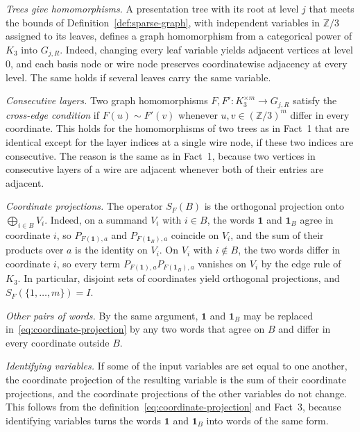 \begin{list}{}{\setlength{\labelwidth}{3.6em}\setlength{\labelsep}{0.6em}\setlength{\leftmargin}{4.2em}\setlength{\itemsep}{3pt}\setlength{\parsep}{0pt}\setlength{\topsep}{4pt}}
\item[\textup{Fact 1.}] \emph{Trees give homomorphisms.} A presentation tree with its root at level $j$ that meets the bounds of Definition~\ref{def:sparse-graph}, with independent variables in $\mathbb Z/3$ assigned to its leaves, defines a graph homomorphism from a categorical power of $K_3$ into $G_{j,R}$. Indeed, changing every leaf variable yields adjacent vertices at level $0$, and each basis node or wire node preserves coordinatewise adjacency at every level. The same holds if several leaves carry the same variable.
\item[\textup{Fact 2.}] \emph{Consecutive layers.} Two graph homomorphisms $F,F':K_3^{\times m}\to G_{j,R}$ satisfy the \emph{cross-edge condition} if $F(u)\sim F'(v)$ whenever $u,v\in(\mathbb Z/3)^m$ differ in every coordinate. This holds for the homomorphisms of two trees as in Fact~1 that are identical except for the layer indices at a single wire node, if these two indices are consecutive. The reason is the same as in Fact~1, because two vertices in consecutive layers of a wire are adjacent whenever both of their entries are adjacent.
\item[\textup{Fact 3.}] \emph{Coordinate projections.} The operator $S_F(B)$ is the orthogonal projection onto $\bigoplus_{i\in B}V_i$. Indeed, on a summand $V_i$ with $i\in B$, the words $\mathbf 1$ and $\mathbf 1_B$ agree in coordinate $i$, so $P_{F(\mathbf 1),a}$ and $P_{F(\mathbf 1_B),a}$ coincide on $V_i$, and the sum of their products over $a$ is the identity on $V_i$. On $V_i$ with $i\notin B$, the two words differ in coordinate $i$, so every term $P_{F(\mathbf 1),a}P_{F(\mathbf 1_B),a}$ vanishes on $V_i$ by the edge rule of $K_3$. In particular, disjoint sets of coordinates yield orthogonal projections, and $S_F(\{1,\ldots,m\})=I$.
\item[\textup{Fact 4.}] \emph{Other pairs of words.} By the same argument, $\mathbf 1$ and $\mathbf 1_B$ may be replaced in~\eqref{eq:coordinate-projection} by any two words that agree on $B$ and differ in every coordinate outside $B$.
\item[\textup{Fact 5.}] \emph{Identifying variables.} If some of the input variables are set equal to one another, the coordinate projection of the resulting variable is the sum of their coordinate projections, and the coordinate projections of the other variables do not change. This follows from the definition~\eqref{eq:coordinate-projection} and Fact~3, because identifying variables turns the words $\mathbf 1$ and $\mathbf 1_B$ into words of the same form.

\end{list}
